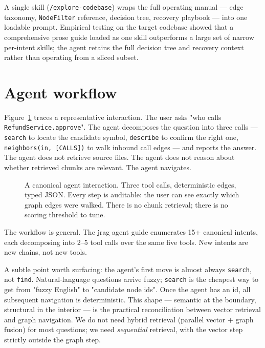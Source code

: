 \documentclass[11pt,a4paper]{article}
\begin{document}
A single skill (\texttt{/explore-codebase}) wraps the full operating manual --- edge taxonomy, \texttt{NodeFilter} reference, decision tree, recovery playbook --- into one loadable prompt. Empirical testing on the target codebase showed that a comprehensive prose guide loaded as one skill outperforms a large set of narrow per-intent skills; the agent retains the full decision tree and recovery context rather than operating from a sliced subset.

\section{Agent workflow}
\label{sec:workflow}

Figure~\ref{fig:workflow} traces a representative interaction. The user asks "who calls \texttt{RefundService.approve}". The agent decomposes the question into three calls --- \texttt{search} to locate the candidate symbol, \texttt{describe} to confirm the right one, \texttt{neighbors(in, [CALLS])} to walk inbound call edges --- and reports the answer. The agent does not retrieve source files. The agent does not reason about whether retrieved chunks are relevant. The agent navigates.

\begin{figure}[!htbp]
\centering
\resizebox{\textwidth}{!}{}
\caption{A canonical agent interaction. Three tool calls, deterministic edges, typed JSON. Every step is auditable: the user can see exactly which graph edges were walked. There is no chunk retrieval; there is no scoring threshold to tune.}
\label{fig:workflow}
\end{figure}

The workflow is general. The jrag agent guide enumerates 15+ canonical intents, each decomposing into 2--5 tool calls over the same five tools. New intents are new chains, not new tools.

A subtle point worth surfacing: the agent's first move is almost always \texttt{search}, not \texttt{find}. Natural-language questions arrive fuzzy; \texttt{search} is the cheapest way to get from "fuzzy English" to "candidate node ids". Once the agent has an id, all subsequent navigation is deterministic. This shape --- semantic at the boundary, structural in the interior --- is the practical reconciliation between vector retrieval and graph navigation. We do not need hybrid retrieval (parallel vector $+$ graph fusion) for most questions; we need \emph{sequential} retrieval, with the vector step strictly outside the graph step.
\end{document}
